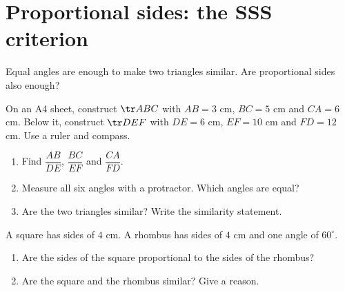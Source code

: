 \section{Proportional sides: the SSS criterion}

Equal angles are enough to make two triangles similar. Are proportional sides also enough?

\begin{solvefirst}
  \item On an A4 sheet, construct $\tr ABC$ with $AB=3$ cm, $BC=5$ cm and $CA=6$ cm. Below it, construct $\tr DEF$ with $DE=6$ cm, $EF=10$ cm and $FD=12$ cm. Use a ruler and compass.
  \begin{enumerate}[label=(\alph*),itemsep=1pt]
    \item Find $\dfrac{AB}{DE}$, $\dfrac{BC}{EF}$ and $\dfrac{CA}{FD}$.
    \item Measure all six angles with a protractor. Which angles are equal?
    \item Are the two triangles similar? Write the similarity statement.
  \end{enumerate}
\begin{solution}
\end{solution}
  \item A square has sides of $4$ cm. A rhombus has sides of $4$ cm and one angle of $60^\circ$.
  \begin{enumerate}[label=(\alph*),itemsep=1pt]
    \item Are the sides of the square proportional to the sides of the rhombus?
    \item Are the square and the rhombus similar? Give a reason.
  \end{enumerate}


\end{solvefirst}
